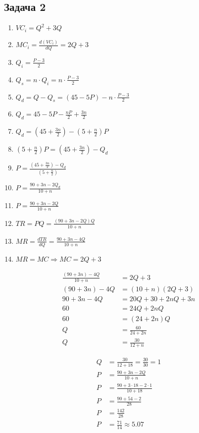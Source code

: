 \documentclass[a4paper,12pt]{article}
\begin{document}
\subsection{Задача 2}
\begin{enumerate}
    \item $VC_i = Q^2 + 3Q$
    \item $MC_i = \frac{d(VC_i)}{dQ} = 2Q + 3$
    \item $Q_i = \frac{P - 3}{2}$
    \item $Q_s = n \cdot Q_i = n \cdot \frac{P - 3}{2}$
    \item $Q_d = Q - Q_s = (45 - 5P) - n \cdot \frac{P - 3}{2}$
    \item $Q_d = 45 - 5P - \frac{nP}{2} + \frac{3n}{2}$
    \item $Q_d = \left(45 + \frac{3n}{2}\right) - \left(5 + \frac{n}{2}\right)P$
    \item $\left(5 + \frac{n}{2}\right)P  = \left(45 + \frac{3n}{2}\right) - Q_d$
    \item $P = \frac{\left(45 + \frac{3n}{2}\right) - Q_d}{\left(5 + \frac{n}{2}\right)}$
    \item $P = \frac{90 + 3n - 2Q_d}{10 + n}$
    \item $P = \frac{90 + 3n - 2Q}{10 + n}$
    \item $TR = PQ = \frac{(90+3n-2Q)Q}{10+n}$
    \item $MR = \frac{dTR}{dQ}=\frac{90+3n-4Q}{10+n}$
    \item $MR = MC \Rightarrow MC = 2Q+3$
\end{enumerate}
\begin{align*}
    \frac{(90 + 3n) - 4Q}{10 + n} &= 2Q + 3 \\
    (90 + 3n) - 4Q &= (10 + n)(2Q + 3) \\
    90 + 3n - 4Q &= 20Q + 30 + 2nQ + 3n \\
    60 &= 24Q + 2nQ \\
    60 &= (24 + 2n)Q \\
    Q &= \frac{60}{24 + 2n} \\
    Q &= \frac{30}{12 + n}
\end{align*}

\begin{align*}
    Q &= \frac{30}{12 + 18} = \frac{30}{30} = 1 \\
    P &= \frac{90 + 3n - 2Q}{10 + n} \\
    P &= \frac{90 + 3 \cdot 18 - 2 \cdot 1}{10 + 18} \\
    P &= \frac{90 + 54 - 2}{28} \\
    P &= \frac{142}{28} \\
    P &= \frac{71}{14} \approx 5.07
\end{align*}
\end{document}
